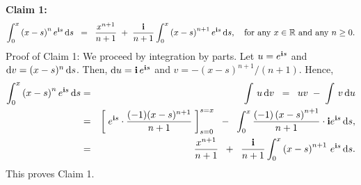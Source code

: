 \vskip 0.5cm
\noindent
\textbf{Claim 1:}
\begin{equation*}
\int_{0}^{x}\left(x-s\right)^{n}e^{\textnormal{\bf i} s}\,\textnormal{d} s
\;\;=\;\;
\dfrac{x^{n+1}}{n+1} \;+\; \dfrac{\textnormal{\bf i}}{n+1}\int_{0}^{x}\left(x-s\right)^{n+1}e^{\textnormal{\bf i} s}\,\textnormal{d} s,
\quad
\textnormal{for any $x \in \mathbb{R}$ and any $n \geq 0$.}
\end{equation*}
{\small Proof of Claim 1: We proceed by integration by parts.
Let $u = e^{\textnormal{\bf i} s}$ and $\textnormal{d} v = (x-s)^{n}\,\textnormal{d} s$.
Then, $\textnormal{d} u = \textnormal{\bf i}\,e^{\textnormal{\bf i} s}$ and $v = -(x-s)^{n+1}/(n+1)$.
Hence,
\begin{eqnarray*}
\int_{0}^{x}\left(x-s\right)^{n}e^{\textnormal{\bf i} s}\,\textnormal{d} s
&=& \int\,u\,\textnormal{d} v
\;\;=\;\; uv \; - \; \int\,v\,\textnormal{d} u
\\
&=&
\left[\;e^{\textnormal{\bf i} s}\cdot\dfrac{(-1)(x-s)^{n+1}}{n+1}\;\right]_{s=0}^{s=x}
\;\; - \;\; \int_{0}^{x}\dfrac{(-1)\left(x-s\right)^{n+1}}{n+1}\cdot\textnormal{\bf i} e^{\textnormal{\bf i} s}\,\textnormal{d} s,
\\
&=&
\dfrac{x^{n+1}}{n+1} \;\; + \;\; \dfrac{\textnormal{\bf i}}{n+1}\int_{0}^{x}\left(x-s\right)^{n+1}\,e^{\textnormal{\bf i} s}\,\textnormal{d} s.
\end{eqnarray*}
This proves Claim 1.
}

